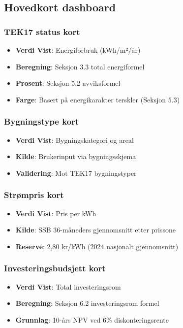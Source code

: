 \documentclass[12pt,a4paper]{article}
\begin{document}
\subsection{Hovedkort dashboard}

\subsubsection{TEK17 status kort}

\begin{itemize}
\item \textbf{Verdi Vist}: Energiforbruk (kWh/m²/år)
\item \textbf{Beregning}: Seksjon 3.3 total energiformel
\item \textbf{Prosent}: Seksjon 5.2 avviksformel
\item \textbf{Farge}: Basert på energikarakter terskler (Seksjon 5.3)
\end{itemize}

\subsubsection{Bygningstype kort}

\begin{itemize}
\item \textbf{Verdi Vist}: Bygningskategori og areal
\item \textbf{Kilde}: Brukerinput via bygningsskjema
\item \textbf{Validering}: Mot TEK17 bygningstyper
\end{itemize}

\subsubsection{Strømpris kort}

\begin{itemize}
\item \textbf{Verdi Vist}: Pris per kWh
\item \textbf{Kilde}: SSB 36-måneders gjennomsnitt etter prissone
\item \textbf{Reserve}: 2,80 kr/kWh (2024 nasjonalt gjennomsnitt)
\end{itemize}

\subsubsection{Investeringsbudsjett kort}

\begin{itemize}
\item \textbf{Verdi Vist}: Total investeringsrom
\item \textbf{Beregning}: Seksjon 6.2 investeringsrom formel
\item \textbf{Grunnlag}: 10-års NPV ved 6\% diskonteringsrente
\end{itemize}
\end{document}
